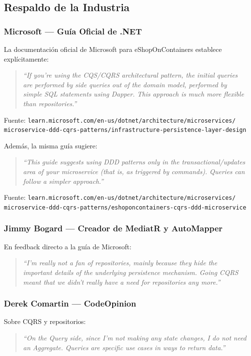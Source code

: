 \documentclass[12pt,a4paper]{article}
\begin{document}
\subsection{Respaldo de la Industria}

\subsubsection{Microsoft --- Gu\'ia Oficial de .NET}
La documentaci\'on oficial de Microsoft para eShopOnContainers establece expl\'icitamente:

\begin{quote}
\textit{``If you're using the CQS/CQRS architectural pattern, the initial queries are performed by side queries out of the domain model, performed by simple SQL statements using Dapper. This approach is much more flexible than repositories.''}
\end{quote}
\small{Fuente: \texttt{learn.microsoft.com/en-us/dotnet/architecture/microservices/\\microservice-ddd-cqrs-patterns/infrastructure-persistence-layer-design}}

\normalsize

Adem\'as, la misma gu\'ia sugiere:
\begin{quote}
\textit{``This guide suggests using DDD patterns only in the transactional/updates area of your microservice (that is, as triggered by commands). Queries can follow a simpler approach.''}
\end{quote}
\small{Fuente: \texttt{learn.microsoft.com/en-us/dotnet/architecture/microservices/\\microservice-ddd-cqrs-patterns/eshoponcontainers-cqrs-ddd-microservice}}

\normalsize

\subsubsection{Jimmy Bogard --- Creador de MediatR y AutoMapper}
En feedback directo a la gu\'ia de Microsoft:
\begin{quote}
\textit{``I'm really not a fan of repositories, mainly because they hide the important details of the underlying persistence mechanism. Going CQRS meant that we didn't really have a need for repositories any more.''}
\end{quote}

\subsubsection{Derek Comartin --- CodeOpinion}
Sobre CQRS y repositorios:
\begin{quote}
\textit{``On the Query side, since I'm not making any state changes, I do not need an Aggregate. Queries are specific use cases in ways to return data.''}
\end{quote}
\end{document}
